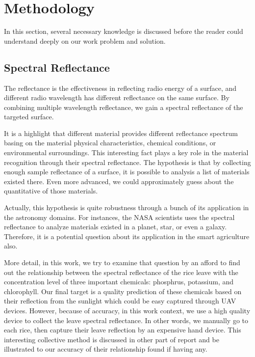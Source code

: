 \section{Methodology} \label{section:background}


In this section, several necessary knowledge is discussed before the reader could understand deeply on our work problem and solution.

\subsection{Spectral Reflectance}

The reflectance is the effectiveness in reflecting radio energy of a surface,
and different radio wavelength has different reflectance on the same surface.
By combining multiple wavelength reflectance,
we gain a spectral reflectance of the targeted surface.

It is a highlight that different material provides different reflectance spectrum
basing on the material physical characteristics, chemical conditions, or environmental surroundings.
This interesting fact plays a key role in the material recognition through their spectral reflectance.
The hypothesis is that by collecting enough sample reflectance of a surface,
it is possible to analysis a list of materials existed there.
Even more advanced, we could approximately guess about the quantitative of those materials.

Actually, this hypothesis is quite robustness
through a bunch of its application in the astronomy domains.
For instances, the NASA scientists uses the spectral reflectance
to analyze materials existed in a planet, star, or even a galaxy.
Therefore, it is a potential question about its application in the smart agriculture also.

More detail, in this work, we try to examine that question by
an afford to find out the relationship between
the spectral reflectance of the rice leave
with the concentration level of three important chemicals: phosphrus, potassium, and chlorophyll.
Our final target is a quality prediction of these chemicals based on their reflection from the sunlight
which could be easy captured through UAV devices.
However, because of accuracy, in this work context,
we use a high quality device to collect the leave spectral reflectance.
In other words, we manually go to each rice, then capture their leave reflection by an expensive hand device.
This interesting collective method is discussed in other part of report
and be illustrated to our accuracy of their relationship found if having any.




